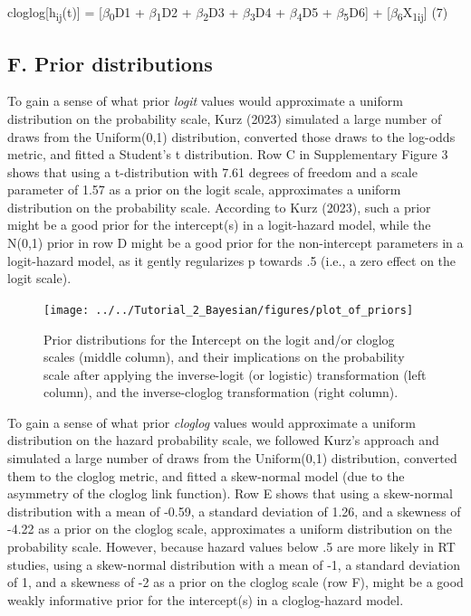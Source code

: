 \documentclass[
  man,floatsintext]{apa6}
\begin{document}
\noindent cloglog{[}h\textsubscript{ij}(t){]} = {[}\(\beta\)\textsubscript{0}D1 + \(\beta\)\textsubscript{1}D2 + \(\beta\)\textsubscript{2}D3 + \(\beta\)\textsubscript{3}D4 + \(\beta\)\textsubscript{4}D5 + \(\beta\)\textsubscript{5}D6{]} + {[}\(\beta\)\textsubscript{6}X\textsubscript{1ij}{]} \hfill  (7)

\subsection{F. Prior distributions}\label{f.-prior-distributions}

To gain a sense of what prior \emph{logit} values would approximate a uniform distribution on the probability scale, Kurz (2023) simulated a large number of draws from the Uniform(0,1) distribution, converted those draws to the log-odds metric, and fitted a Student's t distribution. Row C in Supplementary Figure 3 shows that using a t-distribution with 7.61 degrees of freedom and a scale parameter of 1.57 as a prior on the logit scale, approximates a uniform distribution on the probability scale. According to Kurz (2023), such a prior might be a good prior for the intercept(s) in a logit-hazard model, while the N(0,1) prior in row D might be a good prior for the non-intercept parameters in a logit-hazard model, as it gently regularizes p towards .5 (i.e., a zero effect on the logit scale).



\begin{figure}[H]

{\centering \texttt{[image: ../../Tutorial\_2\_Bayesian/figures/plot\_of\_priors]} 

}

\caption{Prior distributions for the Intercept on the logit and/or cloglog scales (middle column), and their implications on the probability scale after applying the inverse-logit (or logistic) transformation (left column), and the inverse-cloglog transformation (right column).}\label{fig:plot-priors}
\end{figure}

To gain a sense of what prior \emph{cloglog} values would approximate a uniform distribution on the hazard probability scale, we followed Kurz's approach and simulated a large number of draws from the Uniform(0,1) distribution, converted them to the cloglog metric, and fitted a skew-normal model (due to the asymmetry of the cloglog link function). Row E shows that using a skew-normal distribution with a mean of -0.59, a standard deviation of 1.26, and a skewness of -4.22 as a prior on the cloglog scale, approximates a uniform distribution on the probability scale.
However, because hazard values below .5 are more likely in RT studies, using a skew-normal distribution with a mean of -1, a standard deviation of 1, and a skewness of -2 as a prior on the cloglog scale (row F), might be a good weakly informative prior for the intercept(s) in a cloglog-hazard model.
\end{document}
